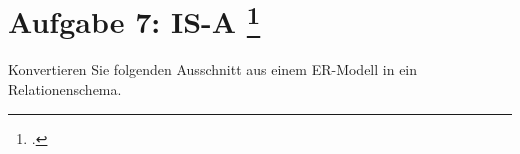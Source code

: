 \documentclass{lehramt-informatik-aufgabe}
\begin{document}

\section{Aufgabe 7: IS-A
\footcite{db:ab:klausurvorbereitung}}

Konvertieren Sie folgenden Ausschnitt aus einem ER-Modell in ein
Relationenschema.
\end{document}
